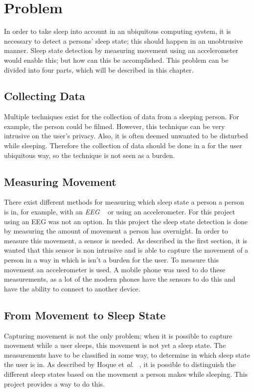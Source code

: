 \chapter{Problem} %
\label{cha:problem}
In order to take sleep into account in an ubiquitous computing system, it is necessary to detect a persons' sleep state; this should happen in an unobtrusive manner. Sleep state detection by measuring movement using an accelerometer would enable this; but how can this be accomplished. This problem can be divided into four parts, which will be described in this chapter.

\section{Collecting Data} %
\label{sec:collecting_data}
Multiple techniques exist for the collection of data from a sleeping person. For example, the person could be filmed. However, this technique can be very intrusive on the user's privacy. Also, it is often deemed unwanted to be disturbed while sleeping. Therefore the collection of data should be done in a for the user ubiquitous way, so the technique is not seen as a burden.

\section{Measuring Movement} %
\label{sec:measuring_movement}
There exist different methods for measuring which sleep state a person a person is in, for example, with an \emph{EEG} ~\cite{Itil196976} or using an accelerometer. For this project using an EEG was not an option. In this project the sleep state detection is done by measuring the amount of movement a person has overnight. In order to measure this movement, a sensor is needed. As described in the first section, it is wanted that this sensor is non intrusive and is able to capture the movement of a person in a way in which is isn't a burden for the user. To measure this movement an accelerometer is used. A mobile phone was used to do these measurements, as a lot of the modern phones have the sensors to do this and have the ability to connect to another device.


\section{From Movement to Sleep State} %
\label{sec:translate_movement_patterns_to_sleep_states}
Capturing movement is not the only problem; when it is possible to capture movement while a user sleeps, this movement is not yet a sleep state. The measurements have to be classified in some way, to determine in which sleep state the user is in. As described by Hoque et \emph{al}. ~\cite{Hoque:2010:MBP:1921081.1921088}, it is possible to distinguish the different sleep states based on the movement a person makes while sleeping. This project provides a way to do this.

